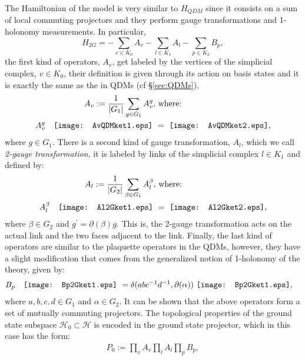 \documentclass[titlepage,11pt]{article}
\theoremstyle{plain}%
\theoremstyle{definition}
\theoremstyle{remark}
\begin{document}
The Hamiltonian of the model is very similar to \(H_{QDM}\) since it consists on a sum of local commuting projectors and they perform gauge transformations and 1-holonomy measurements. In particular, 
\begin{equation}\label{eq:H2G}
H_{2G}=-\sum_{v \in K_0} A_v -\sum_{l \in K_1} A_l - \sum
_{p \in K_2} B_p,
\end{equation}
the first kind of operators, $A_v$, get labeled by the vertices of the simplicial complex, $v \in K_0$, their definition is given through its action on basis states and it is exactly the same as the in QDMs (cf \S \ref{sec:QDMs}), 
\begin{align}
 A_v := \frac{1}{|G_1|}\sum_{g \in G_1}A_v^g, &\ \label{eq:Av2G}  \text{where: } \\
 A_v^g \quad \vcenter{\hbox{\texttt{[image: AvQDMket1.eps]}}}\ &= \ \vcenter{\hbox{\texttt{[image: AvQDMket2.eps]}}}, \nonumber
\end{align}
where $g \in G_1$. There is a second kind of gauge transformation, $A_l$, which we call \emph{2-gauge transformation}, it is labeled by links of the simplicial complex $l \in K_1$ and defined by:
\begin{align}
 A_l := \frac{1}{|G_2|}\sum_{\beta \in G_1}A_l^{\beta}, &\ \label{eq:Al2G} \text{where: } \\
 A_l^\beta \quad \vcenter{\hbox{\texttt{[image: Al2Gket1.eps]}}}\ &= \ \vcenter{\hbox{\texttt{[image: Al2Gket2.eps]}}}, \nonumber
\end{align}
where $\beta \in G_2$ and $g^{\prime}= \partial (\beta) g$. This is, the 2-gauge transformation acts on the actual link and the two faces adjacent to the link. Finally, the last kind of operators are similar to the plaquette operators in the QDMs, however, they have a slight modification that comes from the generalized notion of 1-holonomy of the theory, given by:
\begin{align}\label{eq:Bp2G}
 B_p \quad \vcenter{\hbox{\texttt{[image: Bp2Gket1.eps]}}}\ &= \delta(abc^{-1}d^{-1},\partial(\alpha))\ \vcenter{\hbox{\texttt{[image: Bp2Gket1.eps]}}},
\end{align}
where $a,b,c,d \in G_1$ and $\alpha \in G_2$. It can be shown that the above operators form a set of mutually commuting projectors. The topological properties of the ground state subspace $\mathcal{H}_0 \subset \mathcal{H}$ is encoded in the ground state projector, which in this case has the form:
\begin{align}
P_0:=\prod_{v}A_v\prod_{l}A_l\prod_{p}B_p,
\end{align}
\end{document}
